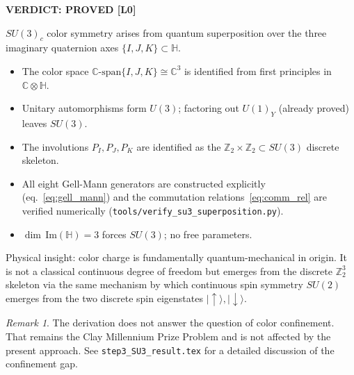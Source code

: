\documentclass[12pt,a4paper]{article}
\theoremstyle{definition}
\theoremstyle{remark}
\newtheorem{remark}[theorem]{Remark}
\begin{document}
\begin{resultbox}
\textbf{VERDICT: PROVED [L0]}

$SU(3)_c$ color symmetry arises from quantum superposition over the
three imaginary quaternion axes $\{I, J, K\} \subset \mathbb{H}$.

\begin{itemize}
  \item The color space $\mathbb{C}\text{-span}\{I,J,K\} \cong \mathbb{C}^3$
        is identified from first principles in $\mathbb{C}\otimes\mathbb{H}$.
  \item Unitary automorphisms form $U(3)$; factoring out $U(1)_Y$ (already
        proved) leaves $SU(3)$.
  \item The involutions $P_I, P_J, P_K$ are identified as the $\mathbb{Z}_2
        \times \mathbb{Z}_2 \subset SU(3)$ discrete skeleton.
  \item All eight Gell-Mann generators are constructed explicitly
        (eq.~\eqref{eq:gell_mann}) and the commutation
        relations~\eqref{eq:comm_rel} are verified numerically
        (\texttt{tools/verify\_su3\_superposition.py}).
  \item $\dim\,\mathrm{Im}(\mathbb{H}) = 3$ forces $SU(3)$; no free
        parameters.
\end{itemize}

Physical insight: color charge is fundamentally quantum-mechanical in
origin.  It is not a classical continuous degree of freedom but emerges
from the discrete $\mathbb{Z}_2^3$ skeleton via the same mechanism by which
continuous spin symmetry $SU(2)$ emerges from the two discrete spin
eigenstates $|\!\uparrow\rangle, |\!\downarrow\rangle$.
\end{resultbox}

\begin{remark}
The derivation does not answer the question of color confinement.
That remains the Clay Millennium Prize Problem and is not affected by
the present approach.  See \texttt{step3\_SU3\_result.tex} for a detailed
discussion of the confinement gap.
\end{remark}

\ifdefined\INCLUDEMODE
\else
  
\end{document}
